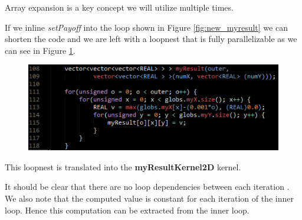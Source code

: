 Array expansion is a key concept we will utilize multiple times.

If we inline \emph{setPayoff} into the loop shown in Figure \ref{fig:new_myresult}
we can shorten the code and we are left with a loopnest that is fully
parallelizable as we can see in Figure \ref{fig:new_myresult2}.

\begin{figure}[!ht]
	\centering
		\includegraphics[scale=0.85]{input/figures/new_myResult2.png}
		\caption{\label{fig:new_myresult2}}
\end{figure}
This loopnest is translated into the \textbf{myResultKernel2D} kernel.

It should be clear that there are no loop dependencies between each iteration
. We also note that the computed value is constant for each iteration of the
inner loop. Hence this computation can be extracted from the inner loop.
